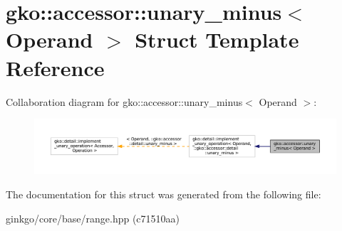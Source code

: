 \hypertarget{structgko_1_1accessor_1_1unary__minus}{}\section{gko\+:\+:accessor\+:\+:unary\+\_\+minus$<$ Operand $>$ Struct Template Reference}
\label{structgko_1_1accessor_1_1unary__minus}


Collaboration diagram for gko\+:\+:accessor\+:\+:unary\+\_\+minus$<$ Operand $>$\+:
\nopagebreak
\begin{figure}[H]
\begin{center}
\leavevmode
\includegraphics[width=350pt]{structgko_1_1accessor_1_1unary__minus__coll__graph}
\end{center}
\end{figure}


The documentation for this struct was generated from the following file\+:\begin{DoxyCompactItemize}
\item 
ginkgo/core/base/range.\+hpp (c71510aa)\end{DoxyCompactItemize}
